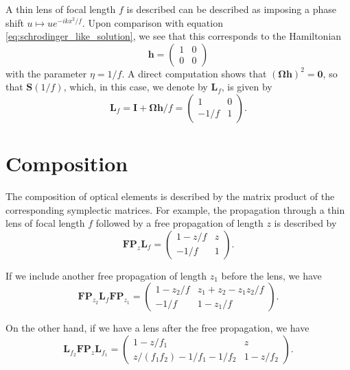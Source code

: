 \documentclass[a4paper,10pt]{report}
\begin{document}
A thin lens of focal length $f$ is described can be described as imposing a phase shift $u \mapsto u e^{-ikx^2/f}$. Upon comparison with equation \eqref{eq:schrodinger_like_solution}, we see that this corresponds to the Hamiltonian
\begin{equation}
    \mathbf{h} = \begin{pmatrix}
        1 & 0 \\
        0 & 0
    \end{pmatrix}
\end{equation}
with the parameter $\eta = 1/f$. A direct computation shows that $(\boldsymbol{\Omega}\mathbf{h})^2 = \boldsymbol{0}$, so that $\mathbf{S}(1/f)$, which, in this case, we denote by $\mathbf{L}_f$, is given by
\begin{equation}
    \mathbf{L}_f = \boldsymbol{I} + \boldsymbol{\Omega}\mathbf{h} / f = \begin{pmatrix}
        1 & 0 \\
        -1/f & 1
    \end{pmatrix} .
\end{equation}

\section{Composition}

The composition of optical elements is described by the matrix product of the corresponding symplectic matrices. For example, the propagation through a thin lens of focal length $f$ followed by a free propagation of length $z$ is described by
\begin{equation}
    \mathbf{FP}_z \mathbf{L}_f = \begin{pmatrix}
        1 - z/f & z \\
        -1/f & 1
    \end{pmatrix} .
\end{equation}

If we include another free propagation of length $z_1$ before the lens, we have
\begin{equation}
    \mathbf{FP}_{z_2} \mathbf{L}_f \mathbf{FP}_{z_1} = \begin{pmatrix}
        1 - z_2/f & z_1 + z_2 - z_1 z_2 / f \\
        -1/f & 1 - z_1 / f
    \end{pmatrix} .
\end{equation}

On the other hand, if we have a lens after the free propagation, we have
\begin{equation}
    \mathbf{L}_{f_2} \mathbf{FP}_{z} \mathbf{L}_{f_1} = \begin{pmatrix}
        1 - z/f_1 & z \\
        z / (f_1 f_2) - 1/f_1 - 1/f_2 & 1 - z / f_2
    \end{pmatrix} .
\end{equation}
\end{document}
